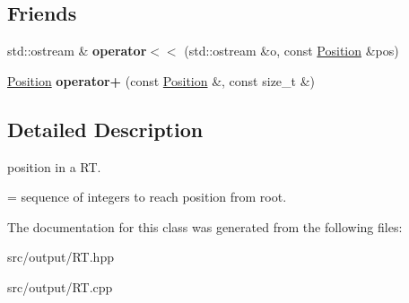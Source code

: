 \subsection*{Friends}
\begin{DoxyCompactItemize}
\item 
\mbox{\label{classPosition_a352cef0201630bbd48cc2cd14ecbe5ab}} 
std\+::ostream \& {\bfseries operator$<$$<$} (std\+::ostream \&o, const \mbox{\hyperlink{classPosition}{Position}} \&pos)
\item 
\mbox{\label{classPosition_adc3afc964f8573df5e41f470340f2935}} 
\mbox{\hyperlink{classPosition}{Position}} {\bfseries operator+} (const \mbox{\hyperlink{classPosition}{Position}} \&, const size\+\_\+t \&)
\end{DoxyCompactItemize}


\subsection{Detailed Description}
position in a RT. 

= sequence of integers to reach position from root. 

The documentation for this class was generated from the following files\+:\begin{DoxyCompactItemize}
\item 
src/output/R\+T.\+hpp\item 
src/output/R\+T.\+cpp\end{DoxyCompactItemize}
